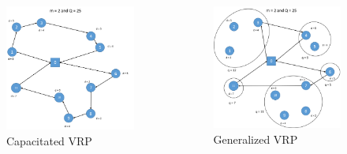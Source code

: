 \documentclass[11pt]{beamer}
\begin{document}
\begin{frame}
\frametitle{\secname}
\begin{columns}[t,onlytextwidth]

\begin{figure}
\centering
\includegraphics[width=\linewidth]{Images/CVRP.png}
\caption{Capacitated VRP}
\end{figure}


\begin{figure}
\centering
\includegraphics[width=\linewidth]{Images/GVRP.png}
\caption{Generalized VRP}
\end{figure}

\end{columns}

\end{frame}
\end{document}
